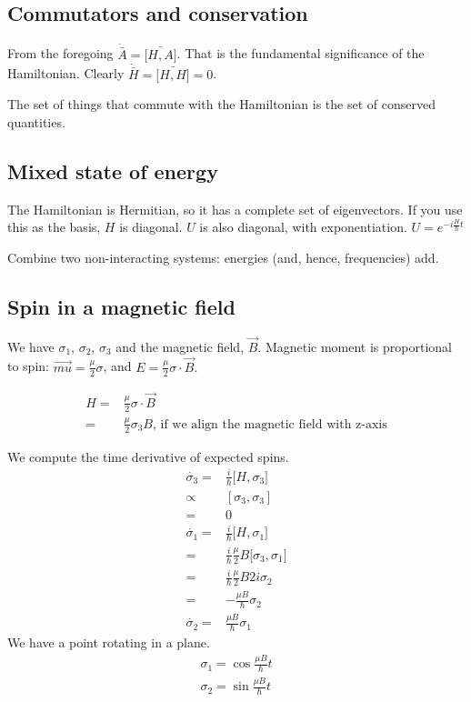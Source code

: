 \documentclass[]{article}
\begin{document}
\subsection{Commutators and conservation}

From the foregoing $\dot{\bar{A}} = \bar{\big[H,A\big]}$. That is the fundamental significance of the Hamiltonian. Clearly $\dot{\bar{H}} = \bar{\big[H,H\big]} = 0$.

The set of things that commute with the Hamiltonian is the set of conserved quantities.

\subsection{Mixed state of energy}

The Hamiltonian is Hermitian, so it has a complete set of eigenvectors. If you use this as the basis, $H$ is diagonal. $U$ is also diagonal, with exponentiation. $U = e^{-i\frac{H}{\hbar}t}$

Combine two non-interacting systems: energies (and, hence, frequencies) add.

\subsection{Spin in a magnetic field}

We have $\sigma_1$, $\sigma_2$, $\sigma_3$ and the magnetic field, $\vec{B}$. Magnetic moment is proportional to spin: $\vec{mu} = \frac{\mu}{2}\sigma$, and $E=\frac{\mu}{2}\sigma \cdot \vec{B}.$

\begin{align*}
	H =& \frac{\mu}{2}\sigma \cdot \vec{B}\\
	=& \frac{\mu}{2}\sigma_3 B \text{, if we align the magnetic field with z-axis}
\end{align*}

We compute the time derivative of expected spins.
\begin{align*}
	\dot{\sigma_3} =& \frac{i}{\hbar} \big[H,\sigma_3\big]\\
	\propto& [\sigma_3,\sigma_3] \\
	=& 0\\
	\dot{\sigma_1} =& \frac{i}{\hbar} \big[H,\sigma_1\big]\\
	=& \frac{i}{\hbar} \frac{\mu}{2} B \big[\sigma_3,\sigma_1\big]\\
	=& \frac{i}{\hbar} \frac{\mu}{2} B 2 i \sigma_2\\
	=& - \frac{\mu B}{\hbar} \sigma_2\\
	\dot{\sigma_2} =&  \frac{\mu B}{\hbar} \sigma_1
\end{align*}
We have a point rotating in a plane.
\begin{align*}
	\sigma_1 = \cos{\frac{\mu B}{\hbar} t}\\
	\sigma_2 = \sin{\frac{\mu B}{\hbar} t}
\end{align*}
\end{document}

